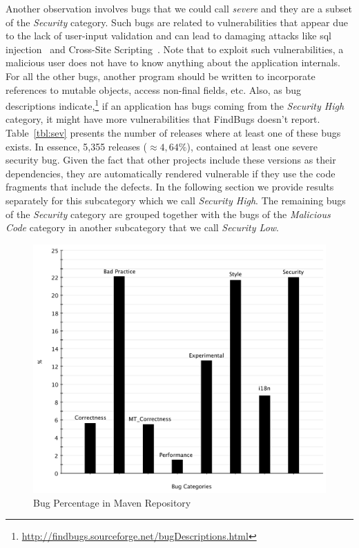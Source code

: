 \documentclass[conference]{llncs}
\begin{document}
Another observation involves bugs that we could call {\it
severe} and they are a subset of the {\it Security} category.
Such bugs are related to vulnerabilities that appear due to the lack of user-input
validation and can lead to damaging attacks like {\sc sql} injection~\cite{RL12} and
Cross-Site Scripting~\cite{WS08}.
Note that to exploit such vulnerabilities, a malicious user does
not have to know anything about the application internals. For all the other
bugs, another program should be written to incorporate references to
mutable objects, access non-final fields, etc.
Also, as bug descriptions indicate,\footnote{\url{http://findbugs.sourceforge.net/bugDescriptions.html}}
if an application has bugs coming from the {\it Security High} category,
it might have more vulnerabilities that FindBugs doesn't report.
Table~\ref{tbl:sev} presents the number
of releases where at least one of these bugs exists. In essence, 5,355 releases
($\approx 4,64\% $), contained at
least one severe security bug. Given the fact that other projects include these
versions as their dependencies, they are automatically rendered vulnerable if
they use the code fragments that include the defects.
In the following section
we provide results separately for this subcategory which we call {\it Security High}.
The remaining bugs of the {\it Security} category
are grouped together with the bugs of the {\it Malicious Code} category
in another subcategory that we call {\it Security Low}.

\begin{figure}[t]
	\centering
	\includegraphics[scale=0.4]{bug_percent}
	\caption{Bug Percentage in Maven Repository}
	\label{fig:bug-per} 
\end{figure}
\end{document}
